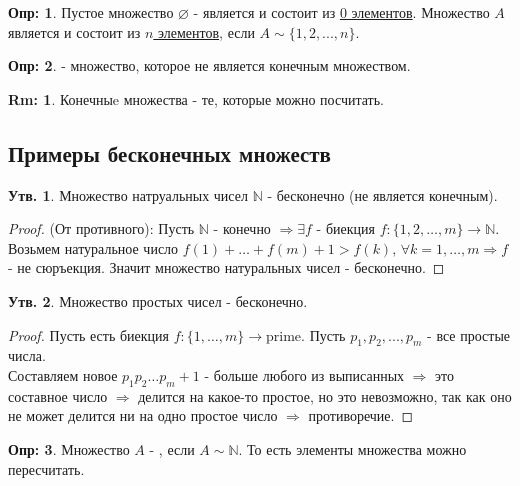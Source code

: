 \documentclass[12pt]{article}
\theoremstyle{definition}
\newtheorem{defn}{Опр:}
\newtheorem{rem}{Rm:}
\newtheorem{prop}{Утв.}
\begin{document}
\begin{defn}
	Пустое множество $\varnothing$ - является  и состоит из \uline{0 элементов}. Множество $A$ является  и состоит из \uline{$n$ элементов}, если $A \sim \{1,2,...,n\}$. 
\end{defn}

\begin{defn}
	 - множество, которое не является конечным множеством.
\end{defn}

\begin{rem}
	Конечныe множества - те, которые можно посчитать.
\end{rem}


\subsection*{Примеры бесконечных множеств}
\begin{prop}
	Множество натруальных чисел $\mathbb{N}$ - бесконечно (не является конечным). 
\end{prop}
\begin{proof}
(От противного): Пусть $\mathbb{N}$ - конечно $\Rightarrow \exists f$ - биекция $f \colon \{1,2,\dotsc,m\} \rightarrow \mathbb{N}$.\\
Возьмем натуральное число $f(1)+\dotsc+f(m)+1> f(k), \, \forall k = 1,\dotsc,m \Rightarrow f$ - не сюръекция.
Значит множество натуральных чисел - бесконечно.
\end{proof}

\begin{prop}
	Множество простых чисел - бесконечно.
\end{prop}

\begin{proof}
Пусть есть биекция $f \colon \{1,\dotsc,m\}\rightarrow \text{prime}$. Пусть $p_1, p_2, ..., p_m$ - все простые числа.\\ 
Составляем новое $p_1p_2\dotsc p_m +1$ - больше любого из выписанных $\Rightarrow$ это составное число $\Rightarrow$ делится на какое-то простое, но это невозможно, так как оно не может делится ни на одно простое число $\Rightarrow$ противоречие.
\end{proof}

\begin{defn}
	Множество $A$ - , если $A \sim \mathbb{N}$. То есть элементы множества можно пересчитать.
\end{defn}
\end{document}
